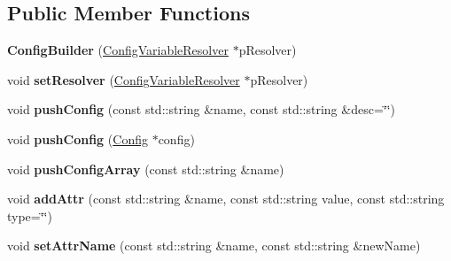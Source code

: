 \subsection*{Public Member Functions}
\begin{DoxyCompactItemize}
\item 
\mbox{\label{classtheoria_1_1config_1_1ConfigBuilder_adf10af8634fe6ce1af5627e2c1ae8baa}} 
{\bfseries Config\+Builder} (\hyperlink{classtheoria_1_1config_1_1ConfigVariableResolver}{Config\+Variable\+Resolver} $\ast$p\+Resolver)
\item 
\mbox{\label{classtheoria_1_1config_1_1ConfigBuilder_aff25e4ada86baf419820b610a4707cbe}} 
void {\bfseries set\+Resolver} (\hyperlink{classtheoria_1_1config_1_1ConfigVariableResolver}{Config\+Variable\+Resolver} $\ast$p\+Resolver)
\item 
\mbox{\label{classtheoria_1_1config_1_1ConfigBuilder_ad7542393581c33259aae6d07d11391dd}} 
void {\bfseries push\+Config} (const std\+::string \&name, const std\+::string \&desc=\char`\"{}\char`\"{})
\item 
\mbox{\label{classtheoria_1_1config_1_1ConfigBuilder_a2dc70e43627e67521bf921152ee3c131}} 
void {\bfseries push\+Config} (\hyperlink{classtheoria_1_1config_1_1Config}{Config} $\ast$config)
\item 
\mbox{\label{classtheoria_1_1config_1_1ConfigBuilder_a38baf2a30a0be4a5e99969c07223bc9b}} 
void {\bfseries push\+Config\+Array} (const std\+::string \&name)
\item 
\mbox{\label{classtheoria_1_1config_1_1ConfigBuilder_ac58bdaa4a914c8ad0c4901128e2e7b6b}} 
void {\bfseries add\+Attr} (const std\+::string \&name, const std\+::string value, const std\+::string type=\char`\"{}\char`\"{})
\item 
\mbox{\label{classtheoria_1_1config_1_1ConfigBuilder_a267121aec4f3c65ff88eb36d691ce509}} 
void {\bfseries set\+Attr\+Name} (const std\+::string \&name, const std\+::string \&new\+Name)

\end{DoxyCompactItemize}
